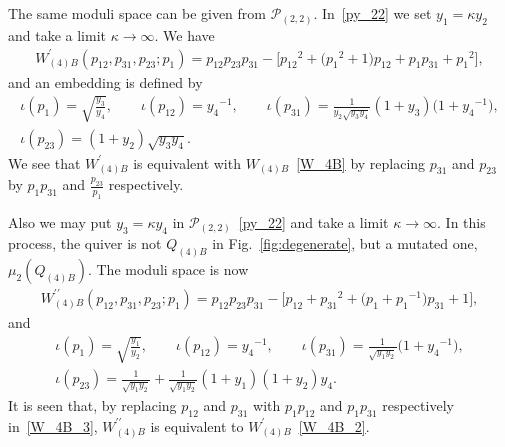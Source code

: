 \documentclass[pdftex]{sigma}
\numberwithin{equation}{section}
\begin{document}
The same moduli space can be given from $\mathcal{P}_{(2,2)}$. In~\eqref{py_22} we set $y_1=\kappa y_2$ and take a limit $\kappa\to\infty$. We have
\begin{gather} \label{W_4B_2}
 W^\prime_{(4)B}(p_{12}, p_{31}, p_{23} ; p_1) = p_{12} p_{23} p_{31} - \big[ {p_{12}}^2 + \big( {p_1}^2 +1 \big) p_{12} + p_1 p_{31} + {p_1}^2 \big] ,
\end{gather}
and an embedding is defined by
\begin{gather*}
\iota(p_1) = \sqrt{\frac{y_3}{y_4}} ,\qquad \iota(p_{12}) = {y_4}^{-1} ,\qquad \iota(p_{31}) = \frac{1}{y_2 \sqrt{y_3 y_4}} (1+y_3 ) \big( 1+ {y_4}^{-1} \big) , \\
 \iota(p_{23}) = (1+y_2) \sqrt{y_3 y_4} .
\end{gather*}
We see that $W^\prime_{(4)B}$ is equivalent with $W_{(4)B}$~\eqref{W_4B} by replacing $p_{31}$ and $p_{23}$ by $p_1 p_{31}$ and $\frac{p_{23}}{p_1}$ respectively.

Also we may put $ y_3 = \kappa y_4$ in $\mathcal{P}_{(2,2)}$~\eqref{py_22} and take a limit $\kappa\to\infty$. In this process, the quiver is not $Q_{(4)B}$ in Fig.~\ref{fig:degenerate}, but a mutated one, $\mu_2(Q_{(4)B})$. The moduli space is now
\begin{gather} \label{W_4B_3}
 W_{(4)B}^{\prime\prime}(p_{12}, p_{31}, p_{23}; p_1) = p_{12} p_{23} p_{31} - \big[ p_{12} + {p_{31}}^2 +\big( p_1+{p_1}^{-1} \big) p_{31} + 1 \big],
\end{gather}
and
\begin{gather*}
 \iota(p_1) = \sqrt{\frac{y_1}{y_2}} , \qquad \iota(p_{12}) = {y_4}^{-1},\qquad \iota(p_{31}) = \frac{1}{\sqrt{y_1 y_2}} \big( 1+{y_4}^{-1} \big) ,\\
 \iota(p_{23}) = \frac{1}{\sqrt{y_1 y_2}} + \frac{1}{\sqrt{y_1 y_2}} ( 1+y_1 ) ( 1+y_2 ) y_4 .
\end{gather*}
It is seen that, by replacing $p_{12}$ and $p_{31}$ with $p_1 p_{12}$ and $p_1 p_{31}$ respectively in~\eqref{W_4B_3}, $W^{\prime\prime}_{(4)B}$ is equivalent to $W^\prime_{(4)B}$~\eqref{W_4B_2}.
\end{document}
